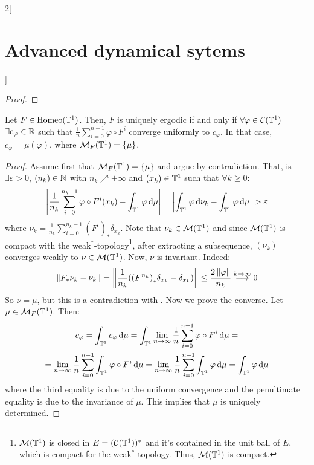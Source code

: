 \documentclass[../../../main_math.tex]{subfiles}
\begin{document}
\begin{multicols}{2}[\section{Advanced dynamical sytems}]
\begin{proof}
  \end{proof}
  \begin{proposition}\label{ADS:birkov_sum_converge}
    Let $F\in \mathrm{Homeo}(\mathbb{T}^1)$. Then, $F$ is uniquely ergodic if and only if $\forall \varphi\in\mathcal{C}(\mathbb{T}^1)$ $\exists c_\varphi\in\mathbb{R}$ such that $\frac{1}{n}\sum_{i=0}^{n-1}\varphi\circ F^i$ converge uniformly to $c_\varphi$. In that case, $c_\varphi=\mu(\varphi)$, where $\mathcal{M}_F(\mathbb{T}^1)=\{\mu\}$.
  \end{proposition}
  \begin{proof}
    Assume first that $\mathcal{M}_F(\mathbb{T}^1)=\{\mu\}$ and argue by contradiction. That, is $\exists \varepsilon>0$, $(n_k)\in\mathbb{N}$ with $n_k\nearrow +\infty$ and $(x_k)\in\mathbb{T}^1$ such that $\forall k\geq 0$:
    \begin{equation}\label{ADS:nuk_mu}
      \abs{\frac{1}{n_k}\sum_{i=0}^{n_k-1}\varphi\circ F^i(x_k)-\int_{\mathbb{T}^1}\varphi\dd{\mu}}=\abs{\int_{\mathbb{T}^1}\varphi\dd{\nu_k}-\int_{\mathbb{T}^1}\varphi\dd{\mu}}>\varepsilon
    \end{equation}
    $$
    $$
    where $\nu_k=\frac{1}{n_k}\sum_{i=0}^{n_k-1}{(F^i)}_*\delta_{x_k}$. Note that $\nu_k\in\mathcal{M}(\mathbb{T}^1)$ and since $\mathcal{M}(\mathbb{T}^1)$ is compact with the weak$^*$-topology\footnote{$\mathcal{M}(\mathbb{T}^1)$ is closed in $E=(\mathcal{C}(\mathbb{T}^1))^*$ and it's contained in the unit ball of $E$, which is compact for the weak$^*$-topology. Thus, $\mathcal{M}(\mathbb{T}^1)$ is compact.}, after extracting a subsequence, $(\nu_k)$ converges weakly to $\nu\in\mathcal{M}(\mathbb{T}^1)$. Now, $\nu$ is invariant. Indeed:
    $$
      \left\|F_*\nu_k-\nu_k\right\|=\left\|\frac{1}{n_k}({(F^{n_k})}_*\delta_{x_k}-\delta_{x_k})\right\|\leq \frac{
        2\left\|\varphi\right\|}{n_k}\overset{k\to\infty}{\longrightarrow} 0
    $$
    So $\nu =\mu$, but this is a contradiction with . Now we prove the converse. Let $\mu\in\mathcal{M}_F(\mathbb{T}^1)$. Then:
    \begin{multline*}
      c_\varphi =\int_{\mathbb{T}^1}c_\varphi\dd{\mu} =\int_{\mathbb{T}^1}\lim_{n\to\infty}\frac{1}{n}\sum_{i=0}^{n-1}\varphi\circ F^i\dd{\mu} =\\
      =\lim_{n\to\infty}\frac{1}{n}\sum_{i=0}^{n-1}\int_{\mathbb{T}^1}\varphi\circ F^i\dd{\mu}=\lim_{n\to\infty}\frac{1}{n}\sum_{i=0}^{n-1}\int_{\mathbb{T}^1}\varphi\dd{\mu} =\int_{\mathbb{T}^1}\varphi\dd{\mu}
    \end{multline*}
    where the third equality is due to the uniform convergence and the penultimate equality is due to the invariance of $\mu$. This implies that $\mu$ is uniquely determined.
  \end{proof}

\end{multicols}
\end{document}
